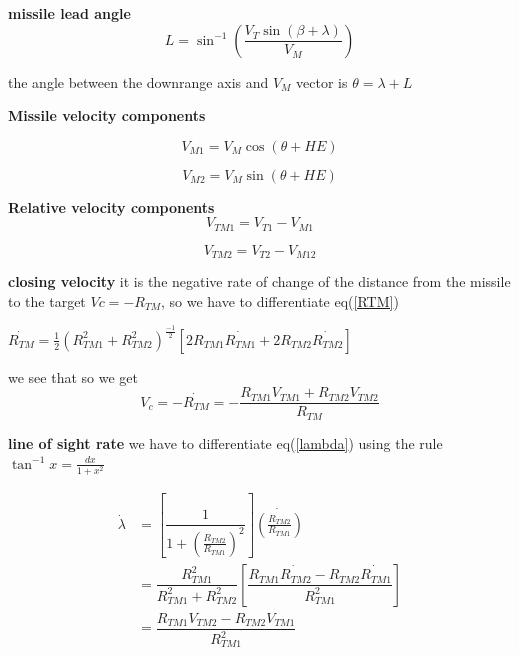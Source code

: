 \textbf{missile lead angle} 
\begin{equation}
	L= \sin^{-1}(\dfrac{V_T \sin(\beta + \lambda)}{V_M})
\end{equation}

the angle between the downrange axis and $V_M$ vector is $\theta = \lambda + L$

\textbf{Missile velocity components} 

\begin{equation}
	V_{M1} = V_M \cos (\theta + HE)
\end{equation}

\begin{equation}
V_{M2} = V_M \sin (\theta + HE)
\end{equation}

\textbf{Relative velocity components}
\begin{equation}
	V_{TM1} = V_{T1} - V_{M1}
\end{equation}

\begin{equation}
V_{TM2} = V_{T2} - V_{M12}
\end{equation}


\textbf{closing velocity} it is the negative rate of change of the distance
from the missile to the target $Vc= -R_{TM} $, so we have to differentiate eq(\ref{RTM})

\begin{center}
	$\dot{R_{TM}}= \frac{1}{2} (R_{TM1}^2 + R_{TM2}^2)^{\frac{-1}{2}} [2 R_{TM1} \dot{R_{TM1}} + 2 R_{TM2} \dot{R_{TM2}}]$
\end{center}

we see that
so we get 
\begin{equation}
	V_c = - \dot{R_{TM}} = - \dfrac{R_{TM1} V_{TM1}+R_{TM2} V_{TM2}}{R_{TM}}
\end{equation}

\textbf{line of sight rate} we have to differentiate eq(\ref{lambda}) using the rule $\tan^{-1}x = \frac{dx}{1+x^2}$ 

\begin{equation}
	\begin{split}
	\dot{\lambda} &= [\dfrac{1}{1+(\frac{R_{TM2}}{R_{TM1}})^2}] \dot{(\frac{R_{TM2}}{R_{TM1}})}\\
	&= \dfrac{R_{TM1}^2}{R_{TM1}^2 + R_{TM2}^2}[\dfrac{R_{TM1}\dot{R_{TM2}}- R_{TM2} \dot{R_{TM1}}}{R_{TM1}^2}]\\
	&=\dfrac{R_{TM1} V_{TM2} - R_{TM2} V_{TM1}}{R_{TM1}^2}
	\end{split}
\end{equation}

